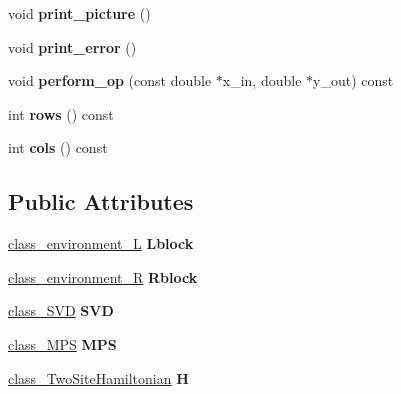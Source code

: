\begin{DoxyCompactItemize}
\item 
void {\bfseries print\+\_\+picture} ()\hypertarget{classclass__superblock_aa40f692fc973def483ef0e88206d288a}{}\label{classclass__superblock_aa40f692fc973def483ef0e88206d288a}

\item 
void {\bfseries print\+\_\+error} ()\hypertarget{classclass__superblock_a1b4599960c84cfa704dc18807a5522b2}{}\label{classclass__superblock_a1b4599960c84cfa704dc18807a5522b2}

\item 
void {\bfseries perform\+\_\+op} (const double $\ast$x\+\_\+in, double $\ast$y\+\_\+out) const \hypertarget{classclass__superblock_aba65a6fd12a15cddd175d29dcb8d89f0}{}\label{classclass__superblock_aba65a6fd12a15cddd175d29dcb8d89f0}

\item 
int {\bfseries rows} () const \hypertarget{classclass__superblock_a7a6c6209412468a5b064e80432c0aa10}{}\label{classclass__superblock_a7a6c6209412468a5b064e80432c0aa10}

\item 
int {\bfseries cols} () const \hypertarget{classclass__superblock_ae7dfb24aa949b5262dad950d2edb874b}{}\label{classclass__superblock_ae7dfb24aa949b5262dad950d2edb874b}

\end{DoxyCompactItemize}
\subsection*{Public Attributes}
\begin{DoxyCompactItemize}
\item 
\hyperlink{classclass__environment___l}{class\+\_\+environment\+\_\+L} {\bfseries Lblock}\hypertarget{classclass__superblock_a44835bbcd2237965741a07c6cbb702db}{}\label{classclass__superblock_a44835bbcd2237965741a07c6cbb702db}

\item 
\hyperlink{classclass__environment___r}{class\+\_\+environment\+\_\+R} {\bfseries Rblock}\hypertarget{classclass__superblock_a1cb3d611b9a4bd2da1b397059bc98043}{}\label{classclass__superblock_a1cb3d611b9a4bd2da1b397059bc98043}

\item 
\hyperlink{classclass___s_v_d}{class\+\_\+\+S\+VD} {\bfseries S\+VD}\hypertarget{classclass__superblock_acc4ae4c82cc07e25706e8699bef0b81c}{}\label{classclass__superblock_acc4ae4c82cc07e25706e8699bef0b81c}

\item 
\hyperlink{classclass___m_p_s}{class\+\_\+\+M\+PS} {\bfseries M\+PS}\hypertarget{classclass__superblock_a9989ee56695bf210091e4a668777b323}{}\label{classclass__superblock_a9989ee56695bf210091e4a668777b323}

\item 
\hyperlink{classclass___two_site_hamiltonian}{class\+\_\+\+Two\+Site\+Hamiltonian} {\bfseries H}\hypertarget{classclass__superblock_a87ddbf7030ccc378a31f0b0e6c28acb4}{}\label{classclass__superblock_a87ddbf7030ccc378a31f0b0e6c28acb4}

\end{DoxyCompactItemize}


